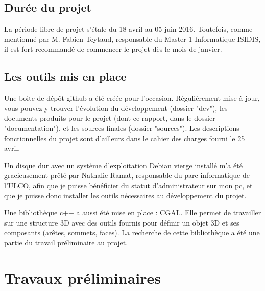 \documentclass[a4paper,french]{report}
\begin{document}
		\section{Durée du projet}
			La période libre de projet s'étale du 18 avril au 05 juin 2016. Toutefois, comme mentionné par M. Fabien Teytaud, responsable du Master 1 Informatique ISIDIS, il est fort recommandé de commencer le projet dès le mois de janvier.
		\section{Les outils mis en place}
			Une boite de dépôt github \cite{GITH01} a été créée pour l'occasion. Régulièrement mise à jour, vous pouvez y trouver l'évolution du développement (dossier "dev"), les documents produits pour le projet (dont ce rapport, dans le dossier "documentation"), et les sources finales (dossier "sources"). Les descriptions fonctionnelles du projet sont d'ailleurs dans le cahier des charges fourni le 25 avril. \par
			Un disque dur avec un système d'exploitation Debian vierge installé m'a été gracieusement prêté par Nathalie Ramat, responsable du parc informatique de l'ULCO, afin que je puisse bénéficier du statut d'administrateur sur mon pc, et que je puisse donc installer les outils nécessaires au développement du projet. \par
			Une bibliothèque c++ a aussi été mise en place : CGAL. \cite{CGAL} Elle permet de travailler sur une structure 3D avec des outils fournis pour définir un objet 3D et ses composants (arêtes, sommets, faces). La recherche de cette bibliothèque a été une partie du travail préliminaire au projet.
			
	\chapter{Travaux préliminaires}
\end{document}
